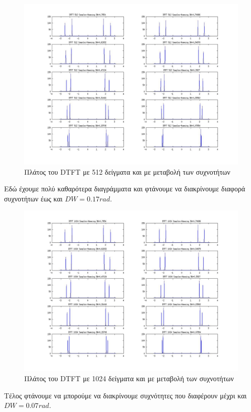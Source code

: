 \documentclass[a4paper,10pt]{article} \usepackage{anysize}
\begin{document}
\begin{figure}[H]
\caption{Πλάτος του DTFT με 512 δείγματα και με μεταβολή των συχνοτήτων}
\centering
	\includegraphics[scale=0.4]{files/14-DTFT_512_Samples-Hamming.jpg}
\end{figure}
Εδώ έχουμε πολύ καθαρότερα διαγράμματα και φτάνουμε να διακρίνουμε διαφορά
συχνοτήτων έως και $DW=0.17rad$.
\begin{figure}[H]
\caption{Πλάτος του DTFT με 1024 δείγματα και με μεταβολή των συχνοτήτων}
\centering
	\includegraphics[scale=0.4]{files/15-DTFT_1024_Samples-Hamming.jpg}
\end{figure}
Τέλος φτάνουμε να μπορούμε να διακρίνουμε συχνότητες που διαφέρουν μέχρι και
$DW=0.07rad$.
\end{document}
